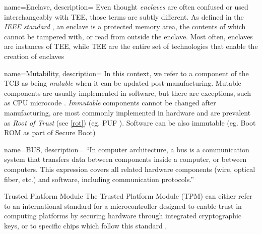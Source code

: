 
 {
    name={Enclave},
    description={
        Even thought \emph{enclaves} are often confused or used interchangeably with
        TEE, those terms are subtly different. As defined in the \emph{IEEE standard}
        \cite{tee_ieee_standard}, an enclave is a protected memory area, the contents
        of which cannot be tampered with, or read from outside the enclave. Most often,
        enclaves are instances of TEE, while TEE are the entire set of technologies
        that enable the creation of enclaves
    }
}

 {
    name=Mutability,
    description={
        In this context, we refer to a component of the TCB as being \emph{mutable}
        when it can be updated post-manufacturing. Mutable components are usually
        implemented in software, but there are exceptions, such as CPU microcode
        \cite{microcode_update}. \emph{Immutable} components cannot be changed after
        manufacturing, are most commonly implemented in hardware and are prevalent as
        \emph{Root of Trust} (see \ref{rot}) (eg. PUF \cite{tee_base_article}).
        Software can be also immutable (eg. Boot ROM as part of Secure Boot)
    }
}

 {
    name=BUS,
    description={
        ``In computer architecture, a bus is a communication system that
        transfers data between components inside a computer, or between
        computers. This expression covers all related hardware components
        (wire, optical fiber, etc.) and software, including communication
        protocols.'' \cite{wiki_bus}
    }
}

 {Trusted Platform Module} {
    The Trusted Platform Module (TPM) can either refer to an international standard
    for a microcontroller designed to enable trust in computing platforms by
    securing hardware through integrated cryptographic keys, or to specific chips 
    which follow this standard \cite{iso_11889}, \cite{wikipedia_tpm}
}

